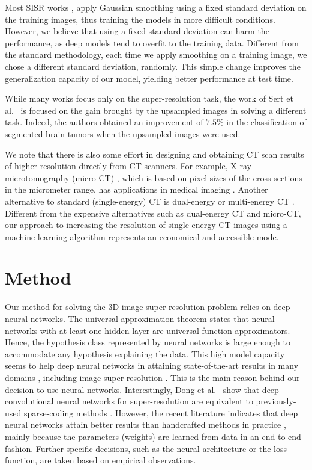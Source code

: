 \documentclass{ieeeaccess}
\begin{document}
Most SISR works \cite{Du-AS-2019, Shi-JBHI-2018, ZENG-CBM-2018}, apply Gaussian smoothing using a fixed standard deviation on the training images, thus training the models in more difficult conditions. However, we believe that using a fixed standard deviation can harm the performance, as deep models tend to overfit to the training data. Different from the standard methodology, each time we apply smoothing on a training image, we chose a different standard deviation, randomly. This simple change improves the generalization capacity of our model, yielding better performance at test time.

While many works focus only on the super-resolution task, the work of Sert et al.~\cite{Sert-MH-2019} is focused on the gain brought by the upsampled images in solving a different task. Indeed, the authors \cite{Sert-MH-2019} obtained an improvement of $7.5\%$ in the classification of segmented brain tumors when the upsampled images were used.

We note that there is also some effort in designing and obtaining CT scan results of higher resolution directly from CT scanners. For example, X-ray microtomography (micro-CT) \cite{Elliott-JM-1982}, which is based on pixel sizes of the cross-sections in the micrometer range, has applications in medical imaging \cite{Enders-PO-2017, Tromba-AIP-2010}. Another alternative to standard (single-energy) CT is dual-energy or multi-energy CT \cite{McCollough-R-2015, Doerner-EJR-2017}. Different from the expensive alternatives such as dual-energy CT and micro-CT, our approach to increasing the resolution of single-energy CT images using a machine learning algorithm represents an economical and accessible mode.

\section{Method} 
\label{sec_Method}

Our method for solving the 3D image super-resolution problem relies on deep neural networks. The universal approximation theorem \cite{Cybenko-MCSS-1989,Hornik-NN-1991} states that neural networks with at least one hidden layer are universal function approximators. Hence, the hypothesis class represented by neural networks is large enough to accommodate any hypothesis explaining the data. This high model capacity seems to help deep neural networks in attaining state-of-the-art results in many domains \cite{LeCun-Nature-2015}, including image super-resolution \cite{Dong-TPAMI-2016}. This is the main reason behind our decision to use neural networks. Interestingly, Dong et al.~\cite{Dong-TPAMI-2016} show that deep convolutional neural networks for super-resolution are equivalent to previously-used sparse-coding methods \cite{Yang-TIP-2010}. However, the recent literature indicates that deep neural networks attain better results than handcrafted methods in practice \cite{Dong-TPAMI-2016,Ionescu-CVPR-2019}, mainly because the parameters (weights) are learned from data in an end-to-end fashion. Further specific decisions, such as the neural architecture or the loss function, are taken based on empirical observations.
\end{document}
